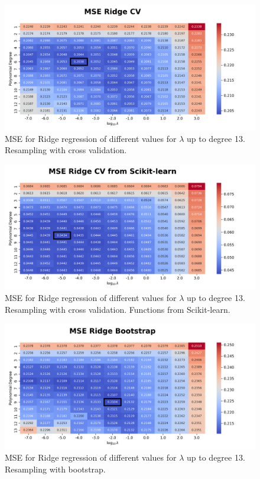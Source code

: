 \documentclass{article}
\begin{document}
\begin{figure}[htbp]
    \centering
    \includegraphics[width=\textwidth]{Project1/figures/Franke/Heatmap_MSE_Ridge_CV.png}
    \caption{MSE for Ridge regression of different values for $\lambda$ up to degree 13. Resampling with cross validation.}
    \label{fig:RidgeCV}
\end{figure}

\begin{figure}[htbp]
    \centering
    \includegraphics[width=\textwidth]{Project1/figures/Franke/Heatmap_MSE_Ridge_CV_from_Scikit-learn.png}
    \caption{MSE for Ridge regression of different values for $\lambda$ up to degree 13. Resampling with cross validation. Functions from Scikit-learn.}
    \label{fig:RidgeCVsklearn}
\end{figure}

\begin{figure}[htbp]
    \centering
    \includegraphics[width=\textwidth]{Project1/figures/Franke/Heatmap_MSE_Ridge_Bootstrap.png}
    \caption{MSE for Ridge regression of different values for $\lambda$ up to degree 13. Resampling with bootstrap.}
    \label{fig:RidgeBootstrap}
\end{figure}
\end{document}
